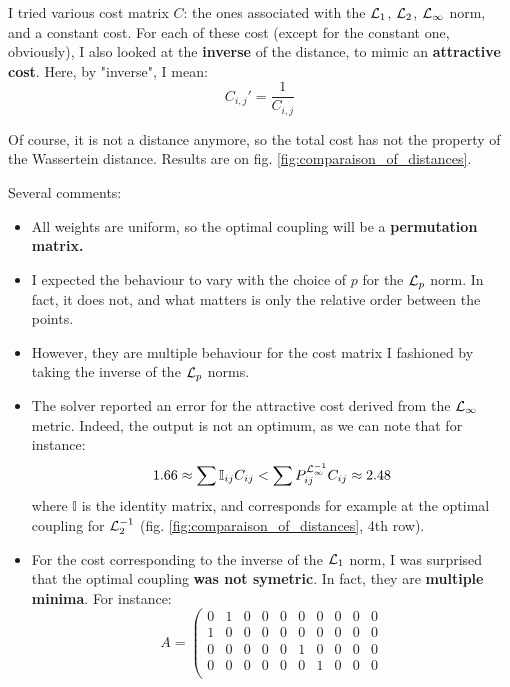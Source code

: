 I tried various cost matrix $C$: the ones associated with the $\mathcal{L}_1$, $\mathcal{L}_2$, $\mathcal{L}_{\infty}$ norm, and a constant cost. For each of these cost (except for the constant one, obviously), I also looked at the \textbf{inverse} of the distance, to mimic an \textbf{attractive cost}. Here, by "inverse", I mean: 
\begin{equation*}
    C_{i, j}' = \frac{1}{C_{i, j}}
\end{equation*}

Of course, it is not a distance anymore, so the total cost has not the property of the Wassertein distance. Results are on fig. \ref{fig:comparaison_of_distances}.

Several comments:
\begin{itemize}
    \item All weights are uniform, so the optimal coupling will be a \textbf{permutation matrix.}
    \item I expected the behaviour to vary with the choice of $p$ for the $\mathcal{L}_p$ norm. In fact, it does not, and what matters is only the relative order between the points.
    \item However, they are multiple behaviour for the cost matrix I fashioned by taking the inverse of the $\mathcal{L}_p$ norms. 
    \item The solver reported an error for the attractive cost derived from the $\mathcal{L}_{\infty}$ metric. Indeed, the output is not an optimum, as we can note that for instance: 
    \begin{equation*}
        1.66 \approx \sum \mathbb{I}_{ij} C_{ij} < \sum P^{\mathcal{L}_\infty^{-1}}_{ij} C_{ij} \approx 2.48
    \end{equation*}
    where $\mathbb{I}$ is the identity matrix, and corresponds for example at the optimal coupling for $\mathcal{L}_2^{-1}$ (fig. \ref{fig:comparaison_of_distances}, 4th row). 
    \item For the cost corresponding to the inverse of the $\mathcal{L}_1$ norm, I was surprised that the optimal coupling \textbf{was not symetric}. In fact, they are \textbf{multiple minima}. For instance: 
    \begin{equation*}
        A = \left(
            \begin{matrix}
            0 & 1 & 0 & 0 & 0 & 0 & 0 & 0 & 0 & 0 \\
            1 & 0 & 0 & 0 & 0 & 0 & 0 & 0 & 0 & 0 \\
            0 & 0 & 0 & 0 & 0 & 1 & 0 & 0 & 0 & 0 \\
            0 & 0 & 0 & 0 & 0 & 0 & 1 & 0 & 0 & 0 \\

\end{matrix}
\end{equation*}
\end{itemize}
